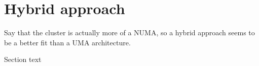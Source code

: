 \documentclass{article}
\begin{document}

\section{Hybrid approach}

Say that the cluster is actually more of a NUMA, so a hybrid approach seems
to be a better fit than a UMA architecture.

Section text


\newpage



% 

\end{document}
